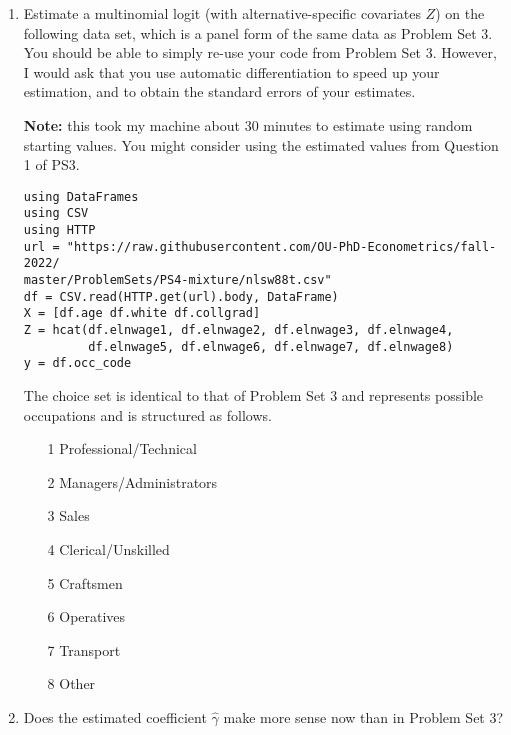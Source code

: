 \documentclass[12pt,english]{article}
\begin{document}
\begin{enumerate}
\item Estimate a multinomial logit (with alternative-specific covariates $Z$) on the following data set, which is a panel form of the same data as Problem Set 3. You should be able to simply re-use your code from Problem Set 3. However, I would ask that you use automatic differentiation to speed up your estimation, and to obtain the standard errors of your estimates.

\textbf{Note:} this took my machine about 30 minutes to estimate using random starting values. You might consider using the estimated values from Question 1 of PS3.

\begin{verbatim}
using DataFrames
using CSV
using HTTP
url = "https://raw.githubusercontent.com/OU-PhD-Econometrics/fall-2022/
master/ProblemSets/PS4-mixture/nlsw88t.csv"
df = CSV.read(HTTP.get(url).body, DataFrame)
X = [df.age df.white df.collgrad]
Z = hcat(df.elnwage1, df.elnwage2, df.elnwage3, df.elnwage4, 
         df.elnwage5, df.elnwage6, df.elnwage7, df.elnwage8)
y = df.occ_code
\end{verbatim}

The choice set is identical to that of Problem Set 3 and represents possible occupations and is structured  as follows.

\begin{enumerate}
    \item[1] Professional/Technical 
    \item[2] Managers/Administrators
    \item[3] Sales                  
    \item[4] Clerical/Unskilled     
    \item[5] Craftsmen              
    \item[6] Operatives             
    \item[7] Transport              
    \item[8] Other                  
\end{enumerate}

\item Does the estimated coefficient $\hat{\gamma}$ make more sense now than in Problem Set 3?


\end{enumerate}
\end{document}
